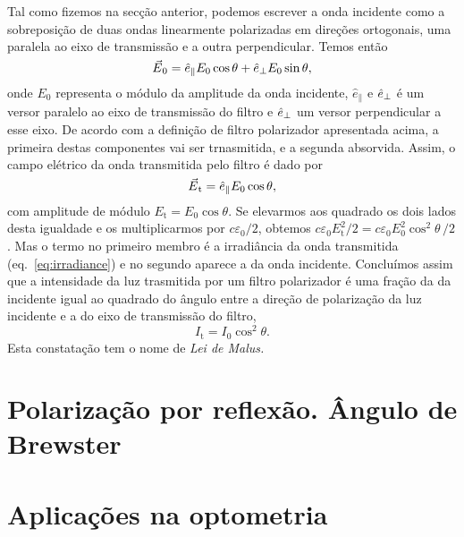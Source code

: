 Tal como fizemos na secção anterior, podemos escrever a onda incidente como a
sobreposição de duas ondas linearmente polarizadas em direções ortogonais, uma
paralela ao eixo de transmissão e a outra perpendicular. Temos então
\begin{equation*}
\vec E_0= \he_\parallel E_0\cos\theta+\he_\perp E_0\sin\theta,
\end{equation*}
onde $E_0$ representa o módulo da amplitude da onda incidente, $\hat
e_\parallel$ e $\hat e_\perp$ é um versor paralelo ao eixo de transmissão do filtro
e $\hat e_\perp$ um versor perpendicular a esse eixo. De acordo com a
definição de filtro polarizador apresentada acima, a primeira destas
componentes vai ser trnasmitida, e a segunda absorvida. Assim, o campo elétrico
da onda transmitida pelo filtro é dado por
\begin{equation}\label{eq:analized}
\vec E_\text{t}=\he_\parallel E_0\cos\theta,
\end{equation}
com amplitude de módulo $E_\text{t}=E_0\cos\theta$. Se elevarmos aos quadrado os
dois lados desta igualdade e os multiplicarmos por $c\varepsilon_0/2$, obtemos
$c\varepsilon_0 E^2_\text{t}/2=c\varepsilon_0 E^2_0\cos^2\theta\,/2$. Mas o
termo no primeiro membro é a irradiância da onda transmitida
(eq.~\eqref{eq:irradiance}) e no segundo aparece a da onda incidente. Concluímos
assim que a intensidade da luz trasmitida por um filtro polarizador é uma fração
da da incidente igual ao quadrado do ângulo entre a direção de polarização da
luz incidente e a do eixo de transmissão do filtro,
\begin{equation*}
I_\text{t}=I_0\cos^2\theta.
\end{equation*}
Esta constatação tem o nome de \emph{Lei de Malus.}



\section{Polarização por reflexão. Ângulo de Brewster}
\tobedone{}
\section{Aplicações na optometria}
\tobedone{}

